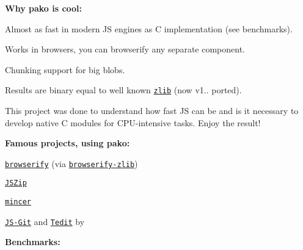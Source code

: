 \href{https://travis-ci.org/nodeca/pako}{\tt } \href{https://www.npmjs.org/package/pako}{\tt }

{\bfseries Why pako is cool\+:}


\begin{DoxyItemize}
\item Almost as fast in modern JS engines as C implementation (see benchmarks).
\item Works in browsers, you can browserify any separate component.
\item Chunking support for big blobs.
\item Results are binary equal to well known \href{http://www.zlib.net/}{\tt zlib} (now v1.. ported).
\end{DoxyItemize}

This project was done to understand how fast JS can be and is it necessary to develop native C modules for C\+P\+U-\/intensive tasks. Enjoy the result!

{\bfseries Famous projects, using pako\+:}


\begin{DoxyItemize}
\item \href{http://browserify.org/}{\tt browserify} (via \href{https://github.com/devongovett/browserify-zlib}{\tt browserify-\/zlib})
\item \href{http://stuk.github.io/jszip/}{\tt J\+S\+Zip}
\item \href{https://github.com/nodeca/mincer}{\tt mincer}
\item \href{https://github.com/creationix/js-git}{\tt J\+S-\/\+Git} and \href{https://chrome.google.com/webstore/detail/tedit-development-environ/ooekdijbnbbjdfjocaiflnjgoohnblgf}{\tt Tedit} by \href{https://github.com/creationix}{\tt }
\end{DoxyItemize}

{\bfseries Benchmarks\+:}


